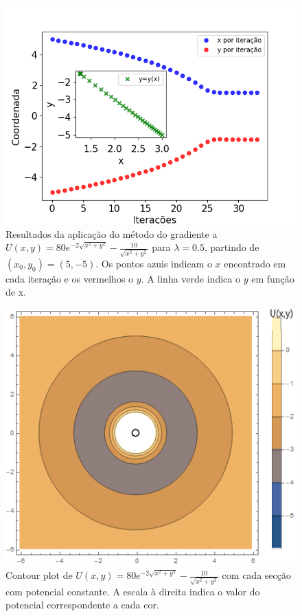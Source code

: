 \documentclass[aps,pre,twocolumn,showpacs,amsmath,amssymb]{revtex4-1}
\begin{document}
\begin{figure}[h]\vspace{-4ex}
   \begin{center}
    \includegraphics[width=\columnwidth]{potencialGradiente2D.png}
\caption{Resultados da aplicação do método do gradiente a $U(x,y)=80e^{-2\sqrt{x^2+y^2}}-\frac{10}{\sqrt{x^2+y^2}}$ para $\lambda=0.5$, partindo de $(x_0,y_0)=(5,-5)$. Os pontos azuis indicam o $x$ encontrado em cada iteração e os vermelhos o $y$. A linha verde indica o $y$ em função de x.}
  \label{potencialGradiente2D}
   \end{center}
\end{figure}

\begin{figure}[h]\vspace{0ex}
   \begin{center}
    \includegraphics[width=\columnwidth]{potencial2DCurvasNivel.png}
\caption{Contour plot de $U(x,y)=80e^{-2\sqrt{x^2+y^2}}-\frac{10}{\sqrt{x^2+y^2}}$ com cada secção com potencial constante. A escala à direita indica o valor do potencial correspondente a cada cor.}
  \label{potencial2DCurvasNivel}
   \end{center}
\end{figure}
\end{document}
